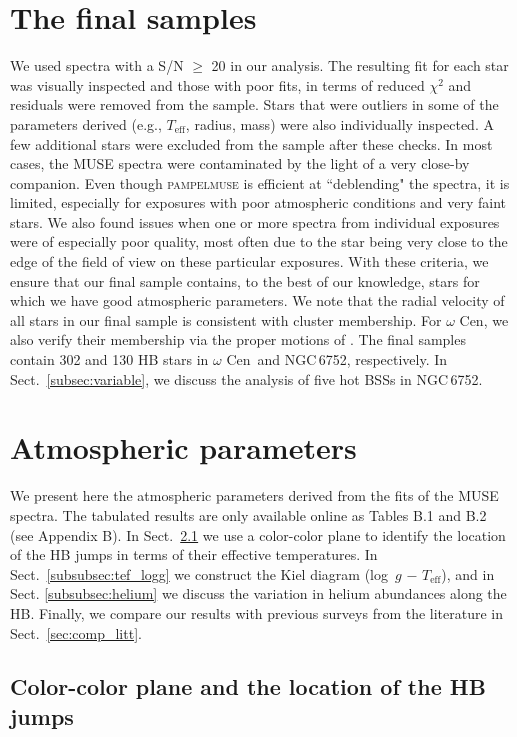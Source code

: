 \documentclass{aa}
\newcommand{\teff}{$T_{\text{eff}}$}
\newcommand{\Cen}{$\omega$ Cen}
\newcommand{\ngc}{NGC\,6752}
\newcommand{\loggt}{log~$g$ $-$ \teff}
\begin{document}
\section{The final samples}\label{sec:sample}
We used spectra with a S/N $\geq$ 20 in our analysis. 
The resulting fit for each star was visually inspected and those with poor fits, in terms of reduced $\chi^2$ and residuals were removed from the sample. Stars that were outliers in some of the parameters derived (e.g., \teff, radius, mass) were also individually inspected. A few additional stars were excluded from the sample after these checks. In most cases, the MUSE spectra were contaminated by the light of a very close-by companion. 
Even though \textsc{pampelmuse} is efficient at ``deblending" the spectra, it is limited, especially for exposures with poor atmospheric conditions and very faint stars. We also found issues when one or more spectra from individual exposures were of especially poor quality, most often due to the star being very close to the edge of the field of view on these particular exposures.
With these criteria, we ensure that our final sample contains, to the best of our knowledge, stars for which we have good atmospheric parameters. We note that the radial velocity of all stars in our final sample is consistent with cluster membership. For \Cen, we also verify their membership via the proper motions of \citet{bellini2017a}.
The final samples contain 302 and 130 HB stars in \Cen\ and \ngc, respectively. In Sect.~\ref{subsec:variable}, we discuss the analysis of five hot BSSs in \ngc.



\section{Atmospheric parameters}\label{subsec:atm_par}

We present here the atmospheric parameters derived from the fits of the MUSE spectra. The tabulated results are only available online as Tables B.1 and B.2 (see Appendix B). 
In Sect.~\ref{subsec:ccp} we use a color-color plane to identify the location of the HB jumps in terms of their effective temperatures. In Sect.~\ref{subsubsec:tef_logg} we construct the Kiel diagram (\loggt), and in Sect. \ref{subsubsec:helium} we discuss the variation in helium abundances along the HB. Finally, we compare our results with previous surveys from the literature in Sect.~\ref{sec:comp_litt}. 


\subsection{Color-color plane and the location of the HB jumps}\label{subsec:ccp}
\end{document}
